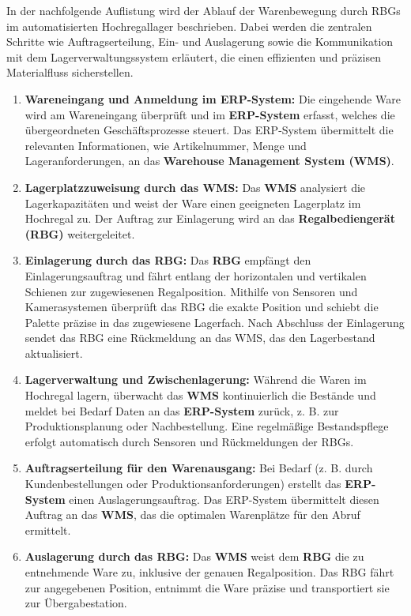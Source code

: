 	In der nachfolgende Auflistung wird der Ablauf der Warenbewegung durch RBGs im automatisierten Hochregallager beschrieben. Dabei werden die zentralen Schritte wie Auftragserteilung, Ein- und Auslagerung sowie die Kommunikation mit dem Lagerverwaltungssystem erläutert, die einen effizienten und präzisen Materialfluss sicherstellen.
\begin{enumerate}
	\item \textbf{Wareneingang und Anmeldung im ERP-System:}  
	Die eingehende Ware wird am Wareneingang überprüft und im \textbf{ERP-System} erfasst, welches die übergeordneten Geschäftsprozesse steuert. Das ERP-System übermittelt die relevanten Informationen, wie Artikelnummer, Menge und Lageranforderungen, an das \textbf{Warehouse Management System (WMS)}.
	
	\item \textbf{Lagerplatzzuweisung durch das WMS:}  
	Das \textbf{WMS} analysiert die Lagerkapazitäten und weist der Ware einen geeigneten Lagerplatz im Hochregal zu. Der Auftrag zur Einlagerung wird an das \textbf{Regalbediengerät (RBG)} weitergeleitet.
	
	\item \textbf{Einlagerung durch das RBG:}  
	Das \textbf{RBG} empfängt den Einlagerungsauftrag und fährt entlang der horizontalen und vertikalen Schienen zur zugewiesenen Regalposition. Mithilfe von Sensoren und Kamerasystemen überprüft das RBG die exakte Position und schiebt die Palette präzise in das zugewiesene Lagerfach. Nach Abschluss der Einlagerung sendet das RBG eine Rückmeldung an das WMS, das den Lagerbestand aktualisiert.
	
	\item \textbf{Lagerverwaltung und Zwischenlagerung:}  
	Während die Waren im Hochregal lagern, überwacht das \textbf{WMS} kontinuierlich die Bestände und meldet bei Bedarf Daten an das \textbf{ERP-System} zurück, z. B. zur Produktionsplanung oder Nachbestellung. Eine regelmäßige Bestandspflege erfolgt automatisch durch Sensoren und Rückmeldungen der RBGs.
	
	\item \textbf{Auftragserteilung für den Warenausgang:}  
	Bei Bedarf (z. B. durch Kundenbestellungen oder Produktionsanforderungen) erstellt das \textbf{ERP-System} einen Auslagerungsauftrag. Das ERP-System übermittelt diesen Auftrag an das \textbf{WMS}, das die optimalen Warenplätze für den Abruf ermittelt.
	
	\item \textbf{Auslagerung durch das RBG:}  
	Das \textbf{WMS} weist dem \textbf{RBG} die zu entnehmende Ware zu, inklusive der genauen Regalposition. Das RBG fährt zur angegebenen Position, entnimmt die Ware präzise und transportiert sie zur Übergabestation.
	

\end{enumerate}
